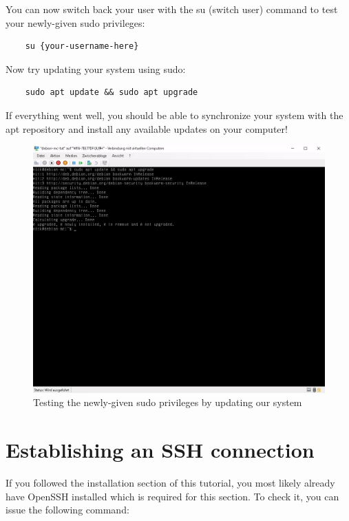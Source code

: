 \documentclass[]{article}
\begin{document}
You can now switch back your user with the su (switch user) command to test your newly-given sudo privileges:

\begin{verbatim}
	su {your-username-here}
\end{verbatim}

Now try updating your system using sudo:

\begin{verbatim}
	sudo apt update && sudo apt upgrade
\end{verbatim}

If everything went well, you should be able to synchronize your system with the apt repository and install any available updates on your computer!

\begin{figure}[h!]
	\caption{Testing the newly-given sudo privileges by updating our system}
	\centering
	\includegraphics[width=1\textwidth]{update}
\end{figure}
\FloatBarrier

\section{Establishing an SSH connection}

If you followed the installation section of this tutorial, you most likely already have OpenSSH installed which is required for this section. To check it, you can issue the following command:
\end{document}
